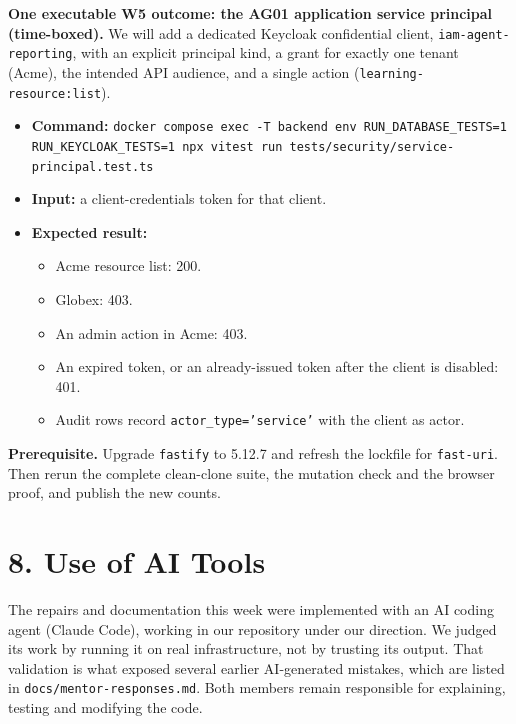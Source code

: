 \documentclass{article}
\begin{document}
\noindent\textbf{One executable W5 outcome: the AG01 application service principal (time-boxed).} We will add a dedicated Keycloak confidential client, \texttt{iam-agent-reporting}, with an explicit principal kind, a grant for exactly one tenant (Acme), the intended API audience, and a single action (\texttt{learning-resource:list}).
\begin{itemize}
    \item \textbf{Command:} \texttt{docker compose exec -T backend env RUN\_DATABASE\_TESTS=1 RUN\_KEYCLOAK\_TESTS=1 npx vitest run tests/security/service-principal.test.ts}
    \item \textbf{Input:} a client-credentials token for that client.
    \item \textbf{Expected result:}
    \begin{itemize}
        \item Acme resource list: 200.
        \item Globex: 403.
        \item An admin action in Acme: 403.
        \item An expired token, or an already-issued token after the client is disabled: 401.
        \item Audit rows record \texttt{actor\_type='service'} with the client as actor.
    \end{itemize}
\end{itemize}

\noindent\textbf{Prerequisite.} Upgrade \texttt{fastify} to 5.12.7 and refresh the lockfile for \texttt{fast-uri}. Then rerun the complete clean-clone suite, the mutation check and the browser proof, and publish the new counts.

\section*{8. Use of AI Tools}
The repairs and documentation this week were implemented with an AI coding agent (Claude Code), working in our repository under our direction. We judged its work by running it on real infrastructure, not by trusting its output. That validation is what exposed several earlier AI-generated mistakes, which are listed in \texttt{docs/mentor-responses.md}. Both members remain responsible for explaining, testing and modifying the code.
\end{document}
